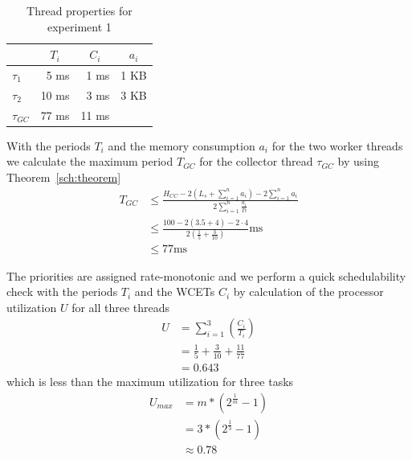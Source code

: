 \begin{table}[tb]
\begin{center}
\begin{tabular}{lrrr}
    \toprule
    & \multicolumn{1}{c}{$T_i$} & \multicolumn{1}{c}{$C_i$} & \multicolumn{1}{c}{$a_i$} \\
    \midrule
    $\tau_1$ & 5 ms & 1 ms & 1 KB \\
    $\tau_2$ & 10 ms & 3 ms & 3 KB \\
    $\tau_{GC}$ & 77 ms & 11 ms & \\
    \bottomrule
\end{tabular}
    \caption{Thread properties for experiment 1}
\label{fig:ex1}
\end{center}
\end{table}

With the periods $T_i$ and the memory consumption $a_i$ for the two
worker threads we calculate the maximum period $T_{GC}$ for the
collector thread $\tau_{GC}$ by using Theorem~\ref{sch:theorem}
\begin{align*}
    T_{GC} & \le \frac{H_{CC}-2\left(L_s+\sum_{i=1}^{n} a_i\right)-2\sum_{i=1}^{n} a_i}
        {2\sum_{i=1}^{n} \frac{a_i}{Ti}} \\
           & \le \frac{100-2(3.5+4)-2\cdot4}
           {2\left(\frac{1}{5}+\frac{3}{10}\right)}\mbox{ms}\\
           & \le 77\mbox{ms}
\end{align*}

The priorities are assigned rate-monotonic \cite{321743} and we
perform a quick schedulability check with the periods $T_i$ and the
WCETs $C_i$ by calculation of the processor utilization $U$ for all
three threads
\begin{align*}
    U & = \sum_{i=1}^{3}\left(\frac{C_i}{T_i}\right)\\
      & = \frac{1}{5} + \frac{3}{10} + \frac{11}{77}\\
      & = 0.643
\end{align*}
which is less than the maximum utilization for three tasks
\begin{align*}
    U_{max} & = m*(2^{\frac{1}{m}}-1)\\
      & = 3*(2^{\frac{1}{3}}-1)\\
      & \approx 0.78
\end{align*}

